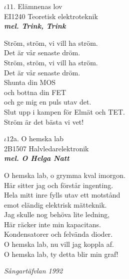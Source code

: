 \documentclass[a6paper,10pt]{article}
\newcommand{\mel}[1]{\small\textbf{\textit{mel. #1 \\}}}
\begin{document}
\setlength{\oddsidemargin}{-0.47in}
\noindent
\begin{center}
\Large $\iota11$. Elämnenas lov \\ 
\footnotesize EI1240 Teoretisk elektroteknik\\
\mel{Trink, Trink}
\end{center}
Ström, ström, vi vill ha ström. \\
Det är vår senaste dröm. \\
Ström, ström, vi vill ha ström. \\
Det är vår senaste dröm. 
\vspace{5pt} \\
Shunta din MOS \\
och bottna din FET \\
och ge mig en puls utav det. \\
Slut upp i kampen för Elmät och TET. \\
Ström är det bästa vi vet! 
\vspace{20pt} 
\begin{center}
\Large $\iota12$a. O hemska lab \\ 
\footnotesize2B1507 Halvledarelektronik\\
\mel{O Helga Natt}
\end{center}
O hemska lab, o grymma kval imorgon. \\
Här sitter jag och förstår ingenting. \\
Hela mitt inre fylls utav ett motstånd \\
emot eländig elektrisk mätteknik. 
\vspace{5pt} \\
Jag skulle nog behöva lite ledning, \\
Här räcker inte min kapacitans. 
\vspace{5pt} \\
Kondensatorer och felvända dioder. \\
O hemska lab, nu vill jag koppla af. \\
O hemska lab, ty detta blir min graf! 
\begin{flushright}
\textit{Sångartäfvlan 1992}
\end{flushright}

\newpage
\setlength{\oddsidemargin}{-0.37in}
\noindent
\end{document}
